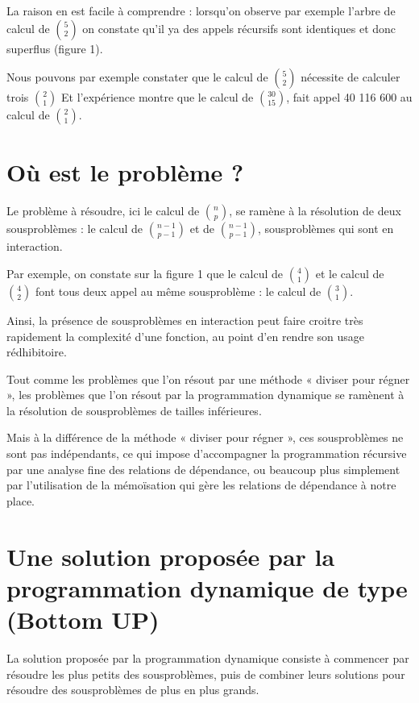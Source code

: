 \documentclass[letterpaper,10pt,english]{jupyterBook}
\begin{document}
\sphinxAtStartPar
La raison en est facile à comprendre : lorsqu’on observe par exemple l’arbre de calcul de \(\binom{5}{2}\) on constate qu’il ya des appels récursifs sont identiques et donc superflus (figure 1).

\sphinxAtStartPar
Nous pouvons par exemple constater que le calcul de \(\binom{5}{2}\) nécessite de calculer trois \(\binom{2}{1}\) Et l’expérience montre que le calcul de \(\binom{30}{15}\), fait appel 40 116 600 au calcul de \(\binom{2}{1}\).

\sphinxAtStartPar
{}


\section{Où est le problème ?}
\label{\detokenize{notebooks/dynamicProgramming/ProgrammationDynamique:ou-est-le-probleme}}
\sphinxAtStartPar
Le problème à résoudre, ici le calcul de \(\binom{n}{p}\), se ramène à la résolution de deux sous\sphinxhyphen{}problèmes : le calcul de \(\binom{n-1}{p-1}\) et de \(\binom{n-1}{p-1}\), sous\sphinxhyphen{}problèmes qui sont en interaction.

\sphinxAtStartPar
Par exemple, on constate sur la figure 1 que le calcul de \(\binom{4}{1}\) et le calcul de \(\binom{4}{2}\) font tous deux appel au même sous\sphinxhyphen{}problème : le calcul de \(\binom{3}{1}\).

\sphinxAtStartPar
Ainsi, la présence de sous\sphinxhyphen{}problèmes en interaction peut faire croitre très rapidement la complexité d’une
fonction, au point d’en rendre son usage rédhibitoire.

\sphinxAtStartPar
Tout comme les problèmes que l’on résout par une méthode « diviser pour régner », les problèmes que l’on
résout par la programmation dynamique se ramènent à la résolution de sous\sphinxhyphen{}problèmes de tailles inférieures.

\sphinxAtStartPar
Mais à la différence de la méthode « diviser pour régner », ces sous\sphinxhyphen{}problèmes ne sont pas indépendants, ce
qui impose d’accompagner la programmation récursive par une analyse fine des relations de dépendance, ou
beaucoup plus simplement par l’utilisation de la mémoïsation qui gère les relations de dépendance à notre
place.


\section{Une solution proposée par la programmation dynamique de type (Bottom UP)}
\label{\detokenize{notebooks/dynamicProgramming/ProgrammationDynamique:une-solution-proposee-par-la-programmation-dynamique-de-type-bottom-up}}
\sphinxAtStartPar
La solution proposée par la programmation dynamique consiste à commencer par résoudre les plus petits des sous\sphinxhyphen{}problèmes, puis de combiner leurs solutions pour résoudre des sous\sphinxhyphen{}problèmes de plus en plus grands.
\end{document}
